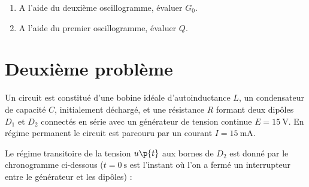 \documentclass[a4paper,french,bookmarks]{article}
\begin{document}
\begin{enumerate}
        \item A l'aide du deuxième oscillogramme, évaluer $G_0$.
        
        
        \item A l'aide du premier oscillogramme, évaluer $Q$.
        
        
    \end{enumerate}
    
    \section{Deuxième problème}
    
    Un circuit est constitué d'une bobine idéale d'autoinductance $L$, un condensateur de capacité $C$, initialement déchargé, et une résistance $R$ formant deux dipôles $D_1$ et $D_2$ connectés en série avec un générateur de tension continue $E = \SI{15}{\volt}$. En régime permanent le circuit est parcouru par un courant $I = \SI{15}{\milli\ampere}$.
    
    Le régime transitoire de la tension $u\p{t}$ aux bornes de $D_2$ est donné par le chronogramme ci-dessous ($t = \SI{0}{\second}$ est l'instant où l'on a fermé un interrupteur entre le générateur et les dipôles) :
    
\end{document}
